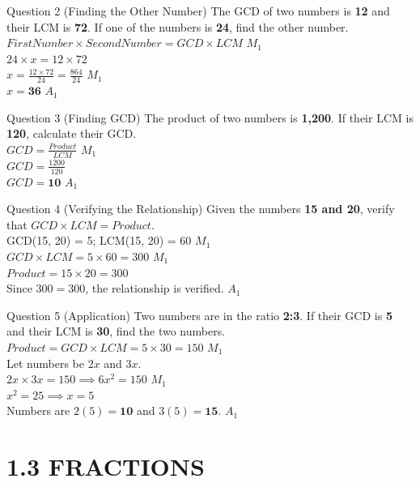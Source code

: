 \documentclass[12pt, a4paper, oneside]{article}
\begin{document}
\begin{solvingbox}{Question 2 (Finding the Other Number)}
The GCD of two numbers is \textbf{12} and their LCM is \textbf{72}. If one of the numbers is \textbf{24}, find the other number. \\
$First Number \times Second Number = GCD \times LCM$ \hfill $M_1$ \\
$24 \times x = 12 \times 72$ \\
$x = \frac{12 \times 72}{24} = \frac{864}{24}$ \hfill $M_1$ \\
$x = \mathbf{36}$ \hfill $A_1$
\end{solvingbox}

\begin{solvingbox}{Question 3 (Finding GCD)}
The product of two numbers is \textbf{1,200}. If their LCM is \textbf{120}, calculate their GCD. \\
$GCD = \frac{Product}{LCM}$ \hfill $M_1$ \\
$GCD = \frac{1200}{120}$ \\
$GCD = \mathbf{10}$ \hfill $A_1$
\end{solvingbox}

\begin{solvingbox}{Question 4 (Verifying the Relationship)}
Given the numbers \textbf{15 and 20}, verify that $GCD \times LCM = Product$. \\
GCD(15, 20) = 5; LCM(15, 20) = 60 \hfill $M_1$ \\
$GCD \times LCM = 5 \times 60 = 300$ \hfill $M_1$ \\
$Product = 15 \times 20 = 300$ \\
Since $300 = 300$, the relationship is verified. \hfill $A_1$
\end{solvingbox}

\begin{solvingbox}{Question 5 (Application)}
Two numbers are in the ratio \textbf{2:3}. If their GCD is \textbf{5} and their LCM is \textbf{30}, find the two numbers. \\
$Product = GCD \times LCM = 5 \times 30 = 150$ \hfill $M_1$ \\
Let numbers be $2x$ and $3x$. \\
$2x \times 3x = 150 \implies 6x^2 = 150$ \hfill $M_1$ \\
$x^2 = 25 \implies x = 5$ \\
Numbers are $2(5) = \mathbf{10}$ and $3(5) = \mathbf{15}$. \hfill $A_1$
\end{solvingbox}

\section*{1.3 FRACTIONS}
\end{document}
